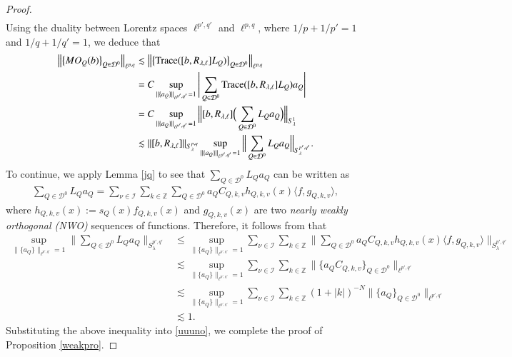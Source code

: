 \documentclass[12pt]{amsart}
\begin{document}
\begin{proof}
\begin{align*}
\end{align*}
Using the duality between Lorentz spaces $\ell^{p',q'}$ and $\ell^{p,q}$, where $1/p+1/p'=1$ and $1/q+1/q'=1$, we deduce that
\begin{align}\label{uuuno}
\left\|\left\{MO_Q(b)\right\}_{Q\in\mathcal{D}^0}\right\|_{\ell^{p,q}}
&\lesssim \left\|\left\{{\rm Trace}([b,R_{\lambda,\ell}]L_{Q})\right\}_{Q\in\mathcal{D}^0}\right\|_{\ell^{p,q}}\nonumber\\
&=C\sup\limits_{\|\{a_Q\}\|_{\ell^{p',q'}}=1}\Bigg|\sum_{Q\in\mathcal{D}^0}{\rm Trace}([b,R_{\lambda,\ell}]L_{Q})a_Q\Bigg|\nonumber\\
&=C\sup\limits_{\|\{a_Q\}\|_{\ell^{p',q'}}=1}\Big\|[b,R_{\lambda,\ell}]\Big(\sum_{Q\in\mathcal{D}^0}L_{Q}a_Q\Big)\Big\|_{S_\lambda^1}\nonumber\\
&\lesssim \|[b,R_{\lambda,\ell}]\|_{S_\lambda^{p,q}}\sup\limits_{\|\{a_Q\}\|_{\ell^{p',q'}}=1}\Big\|\sum_{Q\in\mathcal{D}^0}L_{Q}a_Q\Big\|_{S_\lambda^{p',q'}}.
\end{align}
To continue, we apply Lemma \ref{jq} to see that $\sum_{Q\in\mathcal{D}^0}L_{Q}a_Q$ can be written as
\begin{align*}
\sum_{Q\in\mathcal{D}^0}L_{Q}a_Q=\sum_{\nu\in\mathcal{I}}\sum_{k\in\mathbb{Z}}\sum_{Q\in\mathcal{D}^0}a_QC_{Q,k,v}h_{Q,k,v}(x)\langle f ,g_{Q,k,v}\rangle,
\end{align*}
where $h_{Q,k,v}(x):=s_Q(x)f_{Q,k,v}(x)$ and $g_{Q,k,v}(x)$ are two \emph{nearly weakly orthogonal  (NWO)} sequences of functions. Therefore, {\color{red}it follows from \cite[Corollary 2.7]{RS} that}
\begin{align*}
\sup\limits_{\|\{a_Q\}\|_{\ell^{p',q'}}=1}\Big\|\sum_{Q\in\mathcal{D}^0}L_{Q}a_Q\Big\|_{S_\lambda^{p',q'}}
&\leq \sup\limits_{\|\{a_Q\}\|_{\ell^{p',q'}}=1}\sum_{\nu\in\mathcal{I}}\sum_{k\in\mathbb{Z}}\Big\|\sum_{Q\in\mathcal{D}^0}a_QC_{Q,k,v}h_{Q,k,v}(x)\langle f ,g_{Q,k,v}\rangle\Big\|_{S_\lambda^{p',q'}}\\
&\lesssim \sup\limits_{\|\{a_Q\}\|_{\ell^{p',q'}}=1} \sum_{\nu\in\mathcal{I}}\sum_{k\in\mathbb{Z}}\|\{a_QC_{Q,k,v}\}_{Q\in\mathcal{D}^0}\|_{\ell^{p',q'}}\\
&\lesssim \sup\limits_{\|\{a_Q\}\|_{\ell^{p',q'}}=1} \sum_{\nu\in\mathcal{I}}\sum_{k\in\mathbb{Z}}(1+|k|)^{-N}\|\{a_Q\}_{Q\in\mathcal{D}^0}\|_{\ell^{p',q'}}\\
&\lesssim 1.
\end{align*}
Substituting the above inequality into \eqref{uuuno}, we complete the proof of Proposition \ref{weakpro}.
\end{proof}
\end{document}

